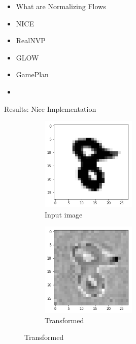 \begin{frame}
\begin{itemize}
    \item What are Normalizing Flows
    \item NICE
    \item RealNVP
    \item GLOW
    \item GamePlan
    \item \textbf{\color{red}{Results}}
\end{itemize}
\end{frame}

\begin{frame}{Results: Nice Implementation}
    \begin{figure}[htbp!]
     \centering
     \begin{subfigure}[b]{0.45\textwidth}
         \centering
         \includegraphics[width=0.5\textwidth]{Images/input.png}
         \caption{Input image}
     \end{subfigure} 
     \hfill
     \begin{subfigure}[b]{0.45\textwidth}
         \centering
         \includegraphics[width=0.5\textwidth]{Images/transformed.png}
         \caption{Transformed}
     \end{subfigure}

\end{figure}
\end{frame}
